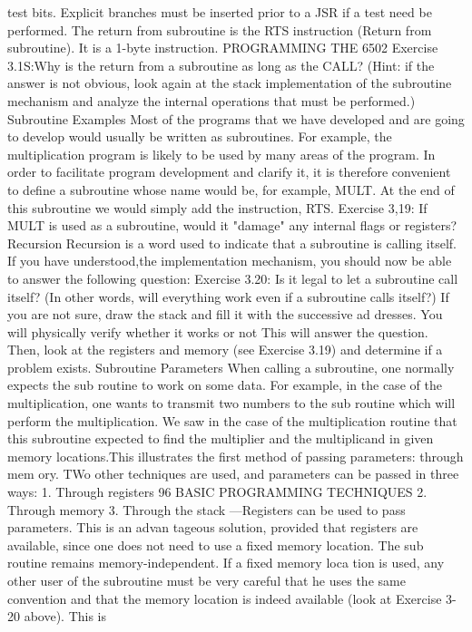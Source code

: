 \documentclass{book}
\begin{document}
test bits. Explicit branches must be inserted prior to a JSR if a
test need be performed.
The return from subroutine is the RTS instruction (Return
from subroutine). It is a 1-byte instruction.
PROGRAMMING THE 6502
Exercise 3.1S:Why is the return from a subroutine as long as the
CALL? (Hint: if the answer is not obvious, look again at the stack
implementation of the subroutine mechanism and analyze the
internal operations that must be performed.)
Subroutine Examples
Most of the programs that we have developed and are going to
develop would usually be written as subroutines. For example,
the multiplication program is likely to be used by many areas of
the program. In order to facilitate program development and
clarify it, it is therefore convenient to define a subroutine whose
name would be, for example, MULT. At the end of this subroutine
we would simply add the instruction, RTS.
Exercise 3,19: If MULT is used as a subroutine, would it "damage"
any internal flags or registers?
Recursion
Recursion is a word used to indicate that a subroutine is calling
itself. If you have understood,the implementation mechanism,
you should now be able to answer the following question:
Exercise 3.20: Is it legal to let a subroutine call itself? (In other
words, will everything work even if a subroutine calls itself?) If
you are not sure, draw the stack and fill it with the successive ad
dresses. You will physically verify whether it works or not This
will answer the question. Then, look at the registers and memory
(see Exercise 3.19) and determine if a problem exists.
Subroutine Parameters
When calling a subroutine, one normally expects the sub
routine to work on some data. For example, in the case of the
multiplication, one wants to transmit two numbers to the sub
routine which will perform the multiplication. We saw in the case
of the multiplication routine that this subroutine expected to find
the multiplier and the multiplicand in given memory locations.This
illustrates the first method of passing parameters: through mem
ory. TWo other techniques are used, and parameters can be passed
in three ways:
1. Through registers
96
BASIC PROGRAMMING TECHNIQUES
2. Through memory
3. Through the stack
—Registers can be used to pass parameters. This is an advan
tageous solution, provided that registers are available, since
one does not need to use a fixed memory location. The sub
routine remains memory-independent. If a fixed memory loca
tion is used, any other user of the subroutine must be very
careful that he uses the same convention and that the memory
location is indeed available (look at Exercise 3-20 above). This is
\end{document}
